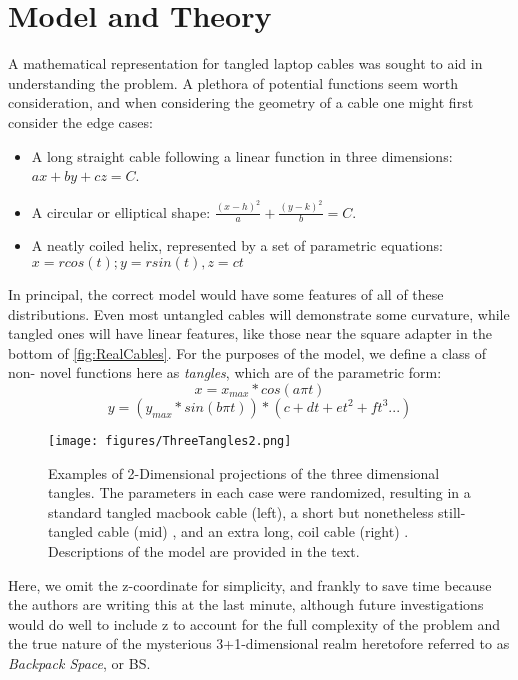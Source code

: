 \documentclass{JINST}
\begin{document}
\section{Model and Theory} \label{sec:samples}

A mathematical representation for tangled laptop cables was sought to aid in understanding the problem. A plethora of potential functions seem worth consideration, and when considering the geometry of a cable one might first consider the edge cases:

\begin{itemize}
\item A long straight cable following a linear function in three dimensions: $ax+by+cz = C$. 
\item A circular or elliptical shape: $\frac{(x-h)^2}{a}+\frac{(y-k)^2}{b}= C$.
\item A neatly coiled helix, represented by a set of parametric equations: $x = rcos(t); y = rsin(t), z = ct$
\end{itemize}

 
In principal, the correct model would have some features of all of these distributions. Even most untangled cables will demonstrate some curvature, while tangled ones will have linear features, like those near the square adapter in the bottom of \ref{fig:RealCables}. For the purposes of the model, we define a class of non- novel functions here as \textit{tangles}, which are of the parametric form:\\
\[ x = x_{max}*cos(a{\pi}t)\]
\[y=(y_{max}*sin(b{\pi}t))*(c+dt+et^2+ft^3...)\]

\begin{figure}[htb]
\texttt{[image: figures/ThreeTangles2.png]} 
    \caption{Examples of 2-Dimensional projections of the three dimensional tangles. The parameters in each case were randomized, resulting in a standard tangled macbook cable (left), a short but nonetheless still-tangled cable (mid) , and an extra long, coil cable (right) . Descriptions of the model are provided in the text.}
    \label{fig:3tangles}
\end{figure}

Here, we omit the z-coordinate for simplicity, and frankly to save time because the authors are writing this at the last minute, although future investigations would do well to include z to account for the full complexity of the problem and the true nature of the mysterious 3+1-dimensional realm heretofore referred to as \textit{Backpack Space}, or BS. 
\end{document}
